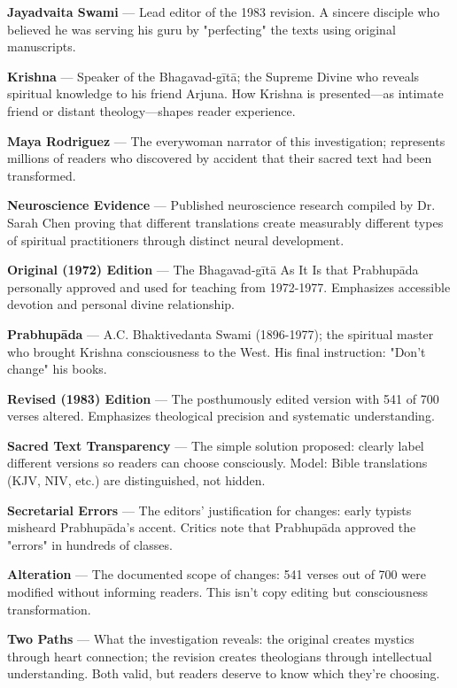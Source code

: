 \documentclass[12pt,twoside]{book}
\begin{document}
\textbf{\textbf{Jayadvaita Swami}} — Lead editor of the 1983 revision. A sincere disciple who believed he was serving his guru by "perfecting" the texts using original manuscripts.

\textbf{\textbf{Krishna}} — Speaker of the Bhagavad-gītā; the Supreme Divine who reveals spiritual knowledge to his friend Arjuna. How Krishna is presented—as intimate friend or distant theology—shapes reader experience.

\textbf{\textbf{Maya Rodriguez}} — The everywoman narrator of this investigation; represents millions of readers who discovered by accident that their sacred text had been transformed.

\textbf{\textbf{Neuroscience Evidence}} — Published neuroscience research compiled by Dr. Sarah Chen proving that different translations create measurably different types of spiritual practitioners through distinct neural development.

\textbf{\textbf{Original (1972) Edition}} — The Bhagavad-gītā As It Is that Prabhupāda personally approved and used for teaching from 1972-1977. Emphasizes accessible devotion and personal divine relationship.

\textbf{\textbf{Prabhupāda}} — A.C. Bhaktivedanta Swami (1896-1977); the spiritual master who brought Krishna consciousness to the West. His final instruction: "Don't change" his books.

\textbf{\textbf{Revised (1983) Edition}} — The posthumously edited version with 541 of 700 verses altered. Emphasizes theological precision and systematic understanding.

\textbf{\textbf{Sacred Text Transparency}} — The simple solution proposed: clearly label different versions so readers can choose consciously. Model: Bible translations (KJV, NIV, etc.) are distinguished, not hidden.

\textbf{\textbf{Secretarial Errors}} — The editors' justification for changes: early typists misheard Prabhupāda's accent. Critics note that Prabhupāda approved the "errors" in hundreds of classes.

\textbf{\textbf{Alteration}} — The documented scope of changes: 541 verses out of 700 were modified without informing readers. This isn't copy editing but consciousness transformation.

\textbf{\textbf{Two Paths}} — What the investigation reveals: the original creates mystics through heart connection; the revision creates theologians through intellectual understanding. Both valid, but readers deserve to know which they're choosing.
\end{document}
